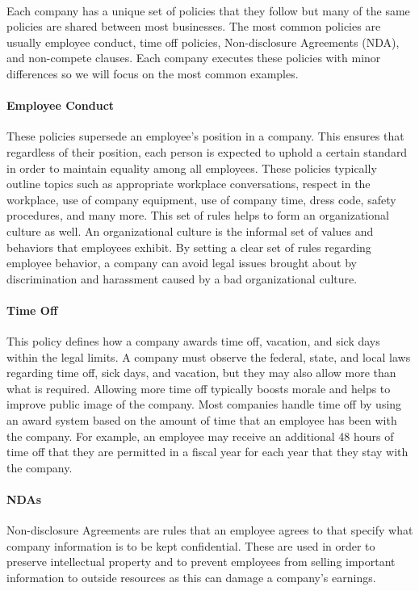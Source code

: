 \documentclass[a4paper,12pt]{article}
\begin{document}
\paragraph{}Each company has a unique set of policies that they follow but many of the same policies are shared between most businesses. The most common policies are usually employee conduct, time off policies, Non-disclosure Agreements (NDA), and non-compete clauses. Each company executes these policies with minor differences so we will focus on the most common examples.
\paragraph{Employee Conduct}These policies supersede an employee's position in a company. This ensures that regardless of their position, each person is expected to uphold a certain standard in order to maintain equality among all employees. These policies typically outline topics such as appropriate workplace conversations, respect in the workplace, use of company equipment, use of company time, dress code, safety procedures, and many more. This set of rules helps to form an organizational culture as well. An organizational culture is the informal set of values and behaviors that employees exhibit. By setting a clear set of rules regarding employee behavior, a company can avoid legal issues brought about by discrimination and harassment caused by a bad organizational culture.
\paragraph{Time Off}This policy defines how a company awards time off, vacation, and sick days within the legal limits. A company must observe the federal, state, and local laws regarding time off, sick days, and vacation, but they may also allow more than what is required. Allowing more time off typically boosts morale and helps to improve public image of the company. Most companies handle time off by using an award system based on the amount of time that an employee has been with the company. For example, an employee may receive an additional 48 hours of time off that they are permitted in a fiscal year for each year that they stay with the company.
\paragraph{NDAs}Non-disclosure Agreements are rules that an employee agrees to that specify what company information is to be kept confidential. These are used in order to preserve intellectual property and to prevent employees from selling important information to outside resources as this can damage a company's earnings.
\end{document}
